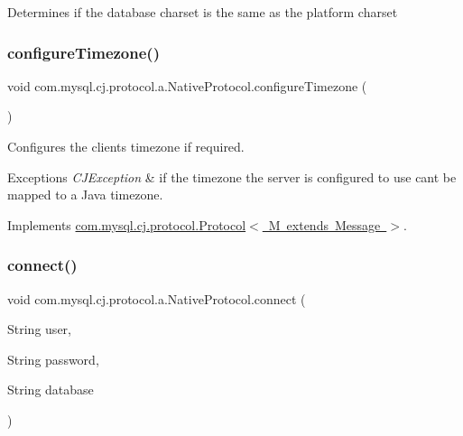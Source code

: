 Determines if the database charset is the same as the platform charset \mbox{\label{classcom_1_1mysql_1_1cj_1_1protocol_1_1a_1_1_native_protocol_a125fe378f81937bcf676327f270f8025}} 
\subsubsection{\texorpdfstring{configure\+Timezone()}{configureTimezone()}}
{\footnotesize\ttfamily void com.\+mysql.\+cj.\+protocol.\+a.\+Native\+Protocol.\+configure\+Timezone (\begin{DoxyParamCaption}{ }\end{DoxyParamCaption})}

Configures the client\textquotesingle{}s timezone if required.


\begin{DoxyExceptions}{Exceptions}
{\em C\+J\+Exception} & if the timezone the server is configured to use can\textquotesingle{}t be mapped to a Java timezone. \\
\hline
\end{DoxyExceptions}


Implements \mbox{\hyperlink{interfacecom_1_1mysql_1_1cj_1_1protocol_1_1_protocol}{com.\+mysql.\+cj.\+protocol.\+Protocol$<$ M extends Message $>$}}.

\mbox{\label{classcom_1_1mysql_1_1cj_1_1protocol_1_1a_1_1_native_protocol_ad567528560d84a107a288dd1c08fb9ce}} 
\subsubsection{\texorpdfstring{connect()}{connect()}}
{\footnotesize\ttfamily void com.\+mysql.\+cj.\+protocol.\+a.\+Native\+Protocol.\+connect (\begin{DoxyParamCaption}\item[{String}]{user,  }\item[{String}]{password,  }\item[{String}]{database }\end{DoxyParamCaption})}

